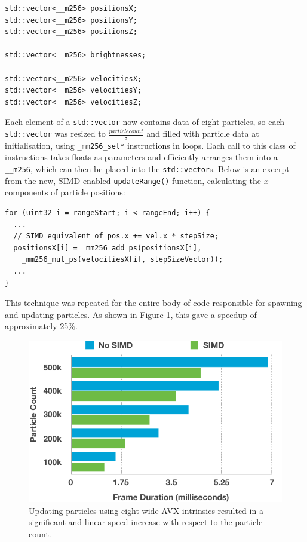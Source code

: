 \documentclass[11pt, a4paper, twocolumn]{article}
\begin{document}
\begin{verbatim}
std::vector<__m256> positionsX;
std::vector<__m256> positionsY;
std::vector<__m256> positionsZ;

std::vector<__m256> brightnesses;

std::vector<__m256> velocitiesX;
std::vector<__m256> velocitiesY;
std::vector<__m256> velocitiesZ;
\end{verbatim}

Each element of a \verb|std::vector| now contains data of eight particles, so each \verb|std::vector| was resized to $\frac{particle count}{8}$ and filled with particle data at initialisation, using \verb|_mm256_set*| instructions in loops. Each call to this class of instructions takes floats as parameters and efficiently arranges them into a \verb|__m256|, which can then be placed into the \verb|std::vector|s. Below is an excerpt from the new, SIMD-enabled \verb|updateRange()| function, calculating the $x$ components of particle positions:

\begin{verbatim}
for (uint32 i = rangeStart; i < rangeEnd; i++) {
  ...
  // SIMD equivalent of pos.x += vel.x * stepSize;
  positionsX[i] = _mm256_add_ps(positionsX[i],
    _mm256_mul_ps(velocitiesX[i], stepSizeVector));
  ...
}
\end{verbatim}

This technique was repeated for the entire body of code responsible for spawning and updating particles. As shown in Figure \ref{fig:nosimd-simd}, this gave a speedup of approximately 25\%.

\begin{figure}[h]
\includegraphics[width=\linewidth]{nosimd-simd}
\caption{Updating particles using eight-wide AVX intrinsics resulted in a significant and linear speed increase with respect to the particle count.}
\label{fig:nosimd-simd}
\end{figure}
\end{document}
